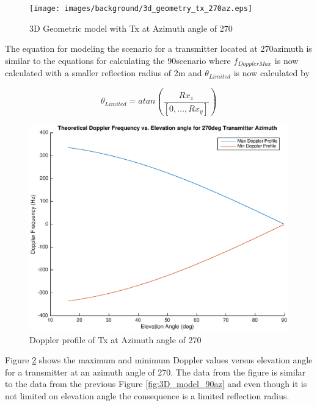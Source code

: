 \begin{figure}
	\begin{center}
		\texttt{[image: images/background/3d\_geometry\_tx\_270az.eps]}
		\caption{3D Geometric model with Tx at Azimuth angle of 270\textdegree}
		\label{fig:3D_model_270az}
	\end{center}
\end{figure}

The equation for modeling the scenario for a transmitter located at 270\textdegree \space azimuth is similar to the equations for calculating the 90\textdegree \space scenario where $f_{DopplerMax}$ is now calculated with a smaller reflection radius of 2m and $\theta_{Limited}$ is now calculated by

\begin{equation}
	\theta_{Limited} = atan\left(\frac{Rx_z}{[0, \dots, Rx_y]}\right)
	\label{eq:theory_270_limited}
\end{equation}

\begin{figure}
	\begin{center}
		\includegraphics[width=15cm]{images/background/3d_geometry_tx_270az_doppler_profile.eps}
		\caption{Doppler profile of Tx at Azimuth angle of 270\textdegree}
		\label{fig:3D_model_270az_doppler}
	\end{center}
\end{figure}

Figure \ref{fig:3D_model_270az_doppler} shows the maximum and minimum Doppler values versus elevation angle for a transmitter at an azimuth angle of 270\textdegree. The data from the figure is similar to the data from the previous Figure \ref{fig:3D_model_90az} and even though it is not limited on elevation angle the consequence is a limited reflection radius.

